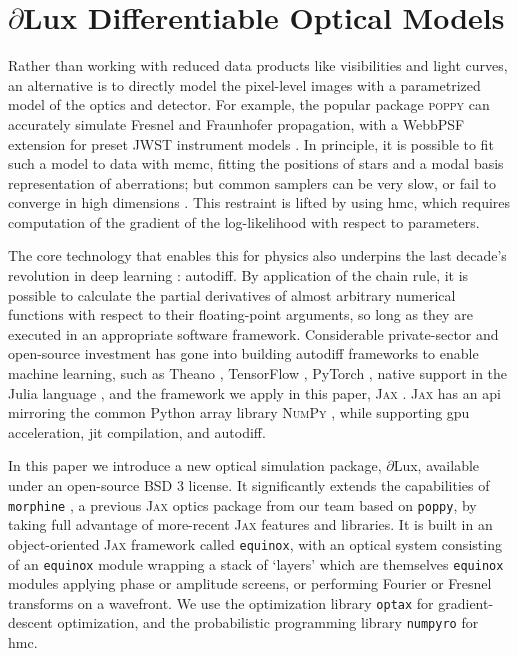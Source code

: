 \documentclass[]{spieman}
\newcommand\jax{\textsc{Jax}\xspace}
\newcommand\dlux{$\partial$Lux\xspace}
\newcommand\equinox{\texttt{equinox}\xspace}
\newcommand\optax{\texttt{optax}\xspace}
\newcommand\numpyro{\texttt{numpyro}\xspace}
\begin{document}
\section{\dlux Differentiable Optical Models}
\label{sec:dlux}

Rather than working with reduced data products like visibilities and light curves, an alternative is to directly model the pixel-level images with a parametrized model of the optics and detector. 
For example, the popular package \textsc{poppy} \cite{poppy} can accurately simulate Fresnel and Fraunhofer propagation, with a WebbPSF extension for preset JWST instrument models \cite{Perrin2014}. 
In principle, it is possible to fit such a model to data with \ac{mcmc}, fitting the positions of stars and a modal basis representation of aberrations; but common samplers can be very slow, or fail to converge in high dimensions \cite{Huijser2022}. This restraint is lifted by using \ac{hmc}, which requires computation of the gradient of the log-likelihood with respect to parameters. 

The core technology that enables this for physics also underpins the last decade's revolution in deep learning \cite{lecun15}: autodiff. By application of the chain rule, it is possible to calculate the partial derivatives of almost arbitrary numerical functions with respect to their floating-point arguments, so long as they are executed in an appropriate software framework. 
Considerable private-sector and open-source investment has gone into building autodiff frameworks to enable machine learning, such as Theano \cite{theano}, TensorFlow \cite{tensorflow2015}, PyTorch \cite{pytorch}, native support in the Julia language \cite{julia}, and the framework we apply in this paper, \textsc{Jax} \cite{jax}. \jax has an \ac{api} mirroring the common Python array library \textsc{NumPy} \cite{numpy}, while supporting \ac{gpu} acceleration, \ac{jit} compilation, and autodiff.

In this paper we introduce a new optical simulation package, \dlux, available under an open-source BSD 3 license. It significantly extends the capabilities of \texttt{morphine} \cite{pope2021,phase_ret_and_design}, a previous \jax optics package from our team based on \texttt{poppy}, by taking full advantage of more-recent \jax features and libraries.  It is built in an object-oriented \jax framework called \equinox \cite{kidger2021equinox}, with an optical system consisting of an \equinox module wrapping a stack of `layers' which are themselves \equinox modules applying phase or amplitude screens, or performing Fourier or Fresnel transforms on a wavefront. We use the optimization library \optax \cite{optax2020github} for gradient-descent optimization, and the probabilistic programming library \numpyro \cite{Phan2019} for \ac{hmc}.
\end{document}
